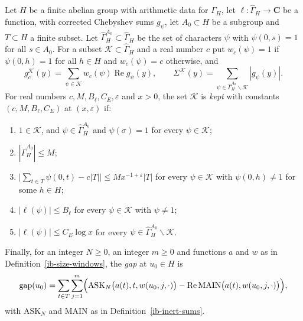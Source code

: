 \begin{definition}\label{ib-kept-characters}
Let $H$ be a finite abelian group with arithmetic data for $\Gamma_H$, let
$\ell:\widehat\Gamma_H\to\mathbf C$ be a function, with corrected Chebyshev sums $g_\psi$,
let $A_0\subset H$ be a subgroup and $T\subset H$ a finite subset. Let
$\widehat\Gamma_H^{A_0}\subset\widehat\Gamma_H$ be the set of characters $\psi$ with
$\psi(0,s)=1$ for all $s\in A_0$. For a subset
$\mathcal K\subset\widehat\Gamma_H$ and a real number $c$ put $w_c(\psi)=1$ if
$\psi(0,h)=1$ for all $h\in H$ and $w_c(\psi)=c$ otherwise, and
\[
 g^{\mathcal K}_c(y)=\sum_{\psi\in\mathcal K}w_c(\psi)\operatorname{Re}g_\psi(y),
 \qquad
 \Sigma^{\mathcal K}(y)=\sum_{\psi\in\widehat\Gamma_H^{A_0}\smallsetminus\mathcal K}|g_\psi(y)|.
\]
For real numbers $c,M,B_\ell,C_E,\varepsilon$ and $x>0$, the set $\mathcal K$ is
\emph{kept} with constants $(c,M,B_\ell,C_E)$ at $(x,\varepsilon)$ if:
\begin{enumerate}
\item[(K1)] $1\in\mathcal K$, and $\psi\in\widehat\Gamma_H^{A_0}$ and $\psi(\sigma)=1$ for
  every $\psi\in\mathcal K$;
\item[(K2)] $|\widehat\Gamma_H^{A_0}|\leq M$;
\item[(K3)] $\bigl|\sum_{t\in T}\psi(0,t)-c|T|\bigr|\leq Mx^{-1+\varepsilon}|T|$
  for every $\psi\in\mathcal K$ with $\psi(0,h)\neq1$ for some $h\in H$;
\item[(K4)] $|\ell(\psi)|\leq B_\ell$ for every $\psi\in\mathcal K$ with
  $\psi\neq1$;
\item[(K5)] $|\ell(\psi)|\leq C_E\log x$ for every
  $\psi\in\widehat\Gamma_H^{A_0}\smallsetminus\mathcal K$.
\end{enumerate}
Finally, for an integer $N\geq0$, an integer $m\geq0$ and functions $a$ and $w$
as in Definition~\ref{ib-size-windows}, the \emph{gap} at $u_0\in H$ is
\[
 \mathrm{gap}(u_0)=\sum_{t\in T}\sum_{j=1}^m\Bigl(\mathrm{ASK}_N\bigl(a(t),t,w(u_0,j,\cdot)\bigr)
 -\operatorname{Re}\mathrm{MAIN}\bigl(a(t),w(u_0,j,\cdot)\bigr)\Bigr),
\]
with $\mathrm{ASK}_N$ and $\mathrm{MAIN}$ as in Definition~\ref{ib-inert-sums}.
\end{definition}

